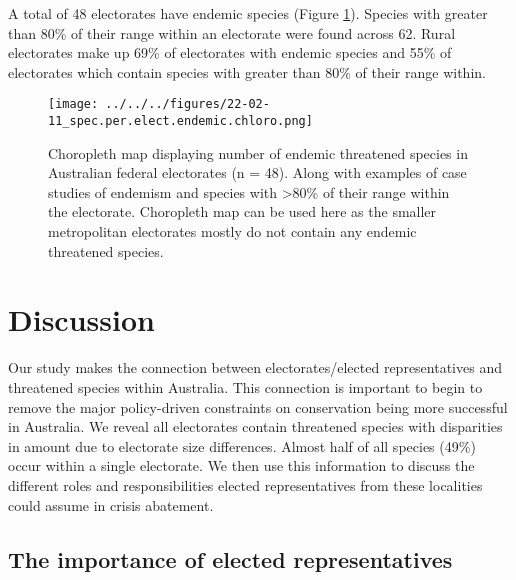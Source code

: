 \documentclass[a4paper,11pt]{article}
\begin{document}
A total of 48 electorates have endemic species (Figure \ref{fig:endemic_chloro}). Species with greater than 80\% of their range within an electorate were found across 62. Rural electorates make up 69\% of electorates with endemic species and 55\% of electorates which contain species with greater than 80\% of their range within.

\begin{figure}[H]
	\centering
    \texttt{[image: ../../../figures/22-02-11\_spec.per.elect.endemic.chloro.png]}
    \caption{Choropleth map displaying number of endemic threatened species in Australian federal electorates (n = 48). Along with examples of case studies of endemism and species with >80\% of their range within the electorate. Choropleth map can be used here as the smaller metropolitan electorates mostly do not contain any endemic threatened species.}
    \label{fig:endemic_chloro}
\end{figure}

\section{Discussion}

Our study makes the connection between electorates/elected representatives and threatened species within Australia. This connection is important to begin to remove the major policy-driven constraints on conservation being more successful in Australia. We reveal all electorates contain threatened species with disparities in amount due to electorate size differences. Almost half of all species (49\%) occur within a single electorate. We then use this information to discuss the different roles and responsibilities elected representatives from these localities could assume in crisis abatement.

\subsection{The importance of elected representatives}
\end{document}
